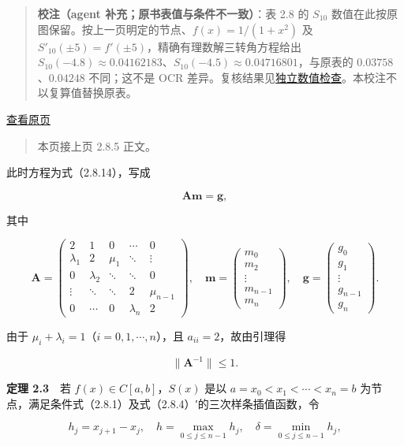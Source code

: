 \documentclass[
  10pt,
  fontset=fandol]{ctexart}
\begin{document}
\begin{quote}
\textbf{校注（agent 补充；原书表值与条件不一致）}：表 2.8 的 \(S_{10}\) 数值在此按原图保留。按上一页明定的节点、\(f(x)=1/(1+x^2)\) 及 \(S'_{10}(\pm5)=f'(\pm5)\)，精确有理数解三转角方程给出 \(S_{10}(-4.8)\approx0.04162183\)、\(S_{10}(-4.5)\approx0.04716801\)，与原表的 \(0.03758\)、\(0.04248\) 不同；这不是 OCR 差异。复核结果见\href{../../staging/ch02b/table-2-8-check.txt}{独立数值检查}。本校注不以复算值替换原表。
\end{quote}

\href{../../source-images/pdf-055.jpeg}{查看原页}

\begin{quote}
本页接上页 2.8.5 正文。
\end{quote}

此时方程为式（2.8.14），写成

\[\boldsymbol A\boldsymbol m=\boldsymbol g,\tag{2.8.24}\]

其中

\[\boldsymbol A=\begin{pmatrix}
2&1&0&\cdots&0\\
\lambda_1&2&\mu_1&\ddots&\vdots\\
0&\lambda_2&\ddots&\ddots&0\\
\vdots&\ddots&\ddots&2&\mu_{n-1}\\
0&\cdots&0&\lambda_n&2
\end{pmatrix},\quad
\boldsymbol m=\begin{pmatrix}m_0\\m_2\\\vdots\\m_{n-1}\\m_n\end{pmatrix},\quad
\boldsymbol g=\begin{pmatrix}g_0\\g_1\\\vdots\\g_{n-1}\\g_n\end{pmatrix}.\]

由于 \(\mu_i+\lambda_i=1\)（\(i=0,1,\cdots,n\)），且 \(a_{ii}=2\)，故由引理得

\[\|\boldsymbol A^{-1}\|\leqslant1.\tag{2.8.25}\]

\textbf{定理 2.3}　若 \(f(x)\in C[a,b]\)，\(S(x)\) 是以 \(a=x_0<x_1<\cdots<x_n=b\) 为节点，满足条件式（2.8.1）及式（2.8.4）′的三次样条插值函数，令

\[h_j=x_{j+1}-x_j,\quad h=\max_{0\leqslant j\leqslant n-1}h_j,\quad\delta=\min_{0\leqslant j\leqslant n-1}h_j,\]
\end{document}
